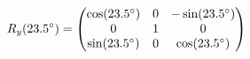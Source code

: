 \documentclass[preview]{standalone}
\begin{document}
\begin{align*}
\special{dvisvgm:raw <g id='unique000'>}R_y(23.5^\circ) = \begin{pmatrix} \cos(23.5^\circ) & 0 & -\sin(23.5^\circ) \\ 0 & 1 & 0 \\ \sin(23.5^\circ) & 0 & \cos(23.5^\circ) \end{pmatrix}\special{dvisvgm:raw </g>}
\end{align*}
\end{document}
